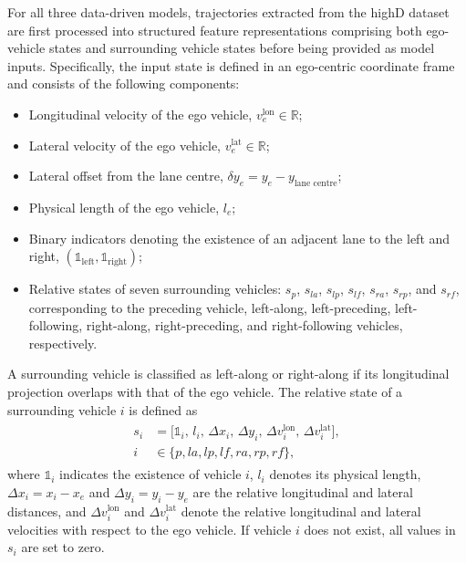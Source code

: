 \documentclass[journal]{IEEEtran}
\begin{document}
For all three data-driven models, trajectories extracted from the highD dataset are first processed into structured feature representations comprising both ego-vehicle states and surrounding vehicle states before being provided as model inputs. Specifically, the input state is defined in an ego-centric coordinate frame and consists of the following components:
\begin{itemize}
    \item Longitudinal velocity of the ego vehicle, $v_e^{\text{lon}} \in \mathbb{R}$;
    \item Lateral velocity of the ego vehicle, $v_e^{\text{lat}} \in \mathbb{R}$;
    \item Lateral offset from the lane centre, $\delta y_e = y_e - y_{\text{lane centre}}$;
    \item Physical length of the ego vehicle, $l_e$;
    \item Binary indicators denoting the existence of an adjacent lane to the left and right, $(\mathds{1}_{\text{left}}, \mathds{1}_{\text{right}})$;
    \item Relative states of seven surrounding vehicles: $s_{p}$, $s_{la}$, $s_{lp}$, $s_{lf}$, $s_{ra}$, $s_{rp}$, and $s_{rf}$, corresponding to the preceding vehicle, left-along, left-preceding, left-following, right-along, right-preceding, and right-following vehicles, respectively.
\end{itemize}

A surrounding vehicle is classified as left-along or right-along if its longitudinal projection overlaps with that of the ego vehicle. The relative state of a surrounding vehicle $i$ is defined as
\begin{align}\label{eq:relativeStates}
\begin{split}
    s_i &=
    \bigl[
        \mathds{1}_{i},\,
        l_i,\,
        \Delta x_i,\,
        \Delta y_i,\,
        \Delta v_i^{\text{lon}},\,
        \Delta v_i^{\text{lat}}
    \bigr], \\
    i &\in \{p, la, lp, lf, ra, rp, rf\},
\end{split}
\end{align}
where $\mathds{1}_{i}$ indicates the existence of vehicle $i$, $l_i$ denotes its physical length, $\Delta x_i = x_i - x_e$ and $\Delta y_i = y_i - y_e$ are the relative longitudinal and lateral distances, and $\Delta v_i^{\text{lon}}$ and $\Delta v_i^{\text{lat}}$ denote the relative longitudinal and lateral velocities with respect to the ego vehicle. If vehicle $i$ does not exist, all values in $s_i$ are set to zero.
\end{document}
